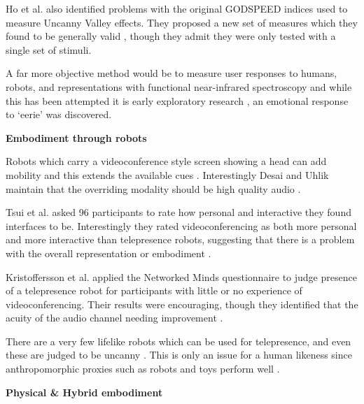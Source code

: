                     Ho et al. also identified problems with the original GODSPEED indices used to measure Uncanny Valley effects. They proposed a new set of measures which they found to be generally valid \cite{Ho:2010:RUV:1853385.1853509}, though they admit they were only tested with a single set of stimuli.\par
                    A far more objective method would be to measure user responses to humans, robots, and representations with functional near-infrared spectroscopy and while this has been attempted it is early exploratory research \cite{Strait2014}, an emotional response to `eerie' was discovered.\par
                    
\textbf{Embodiment through robots}

                    Robots which carry a videoconference style screen showing a head can add mobility and this extends the available cues \cite{Adalgeirsson2010, Lee2011b, Tsui2011, Paulos1998, Kristoffersson2013}. Interestingly Desai and Uhlik maintain that the overriding modality should be high quality audio \cite{Desai2011}.\par
                    Tsui et al. asked 96 participants to rate how personal and interactive they found interfaces to be. Interestingly they rated videoconferencing as both more personal and more interactive than telepresence robots, suggesting that there is a problem with the overall representation or embodiment \cite{Tsui2012}.\par
                    Kristoffersson et al. applied the Networked Minds questionnaire to judge presence of a telepresence robot for participants with little or no experience of videoconferencing. Their results were encouraging, though they identified that the acuity of the audio channel needing improvement \cite{Kristoffersson2011}.\par
                    There are a very few lifelike robots which can be used for telepresence, and even these are judged to be uncanny \cite{Sakamoto2007}. This is only an issue for a human likeness since anthropomorphic proxies such as robots and toys perform well \cite{Mori1970}.\par
                    
 \textbf{Physical \& Hybrid embodiment}
 
